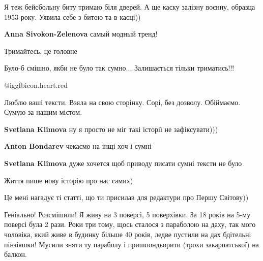  
 
 
 
 
\zzSecCmt

\begin{itemize} %

Я теж бейсбольну биту тримаю біля дверей. А ще каску залізну воєнну, образца
1953 року. Уявила себе з битою та в касці))

\textbf{Anna Sivokon-Zelenova} самый модный тренд!

Тримайтесь, це головне

Було-б смішно, якби не було так сумно... Залишається тільки триматись!!!

@igg{fbicon.heart.red}

\begin{itemize} %

Люблю ваші тексти. Взяла на свою сторінку. Сорі, без дозволу. Обіймаємо. Сумую
за нашим містом.

\textbf{Svetlana Klimova} ну я просто не міг такі історії не зафіксувати)))

\textbf{Anton Bondarev} чекаємо на інщі хоч і сумні

\textbf{Svetlana Klimova} дуже хочется щоб приводу писати сумні тексти не було
\end{itemize} %


Життя пише нову історію про нас самих)

Це мені нагадує ті статті, що ти присилав для редактури про Першу Світову))


Геніально! Розсмішили! Я живу на 3 поверсі, 5 поверхівки. За 18 років на 5-му
поверсі була 2 рази. Роки три тому, щось сталося з параболою на даху, так мого
чоловіка, який живе в будинку більше 40 років, ледве пустили на дах бдітельні
пінзіяшки! Мусили зняти ту параболу і пришпондьорити (трохи закарпатської) на
балкон.


\end{itemize}
